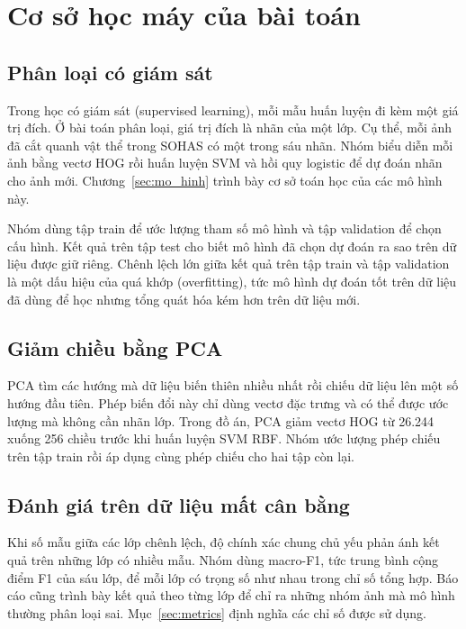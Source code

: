 \section{Cơ sở học máy của bài toán}
\label{sec:hoc_may}

\subsection{Phân loại có giám sát}

Trong học có giám sát (supervised learning), mỗi mẫu huấn luyện đi kèm một giá trị đích. Ở bài toán phân loại, giá trị đích là nhãn của một lớp. Cụ thể, mỗi ảnh đã cắt quanh vật thể trong SOHAS có một trong sáu nhãn. Nhóm biểu diễn mỗi ảnh bằng vectơ HOG rồi huấn luyện SVM và hồi quy logistic để dự đoán nhãn cho ảnh mới. Chương~\ref{sec:mo_hinh} trình bày cơ sở toán học của các mô hình này.

Nhóm dùng tập train để ước lượng tham số mô hình và tập validation để chọn cấu hình. Kết quả trên tập test cho biết mô hình đã chọn dự đoán ra sao trên dữ liệu được giữ riêng. Chênh lệch lớn giữa kết quả trên tập train và tập validation là một dấu hiệu của quá khớp (overfitting), tức mô hình dự đoán tốt trên dữ liệu đã dùng để học nhưng tổng quát hóa kém hơn trên dữ liệu mới.

\subsection{Giảm chiều bằng PCA}

PCA tìm các hướng mà dữ liệu biến thiên nhiều nhất rồi chiếu dữ liệu lên một số hướng đầu tiên. Phép biến đổi này chỉ dùng vectơ đặc trưng và có thể được ước lượng mà không cần nhãn lớp. Trong đồ án, PCA giảm vectơ HOG từ 26.244 xuống 256 chiều trước khi huấn luyện SVM RBF. Nhóm ước lượng phép chiếu trên tập train rồi áp dụng cùng phép chiếu cho hai tập còn lại.

\subsection{Đánh giá trên dữ liệu mất cân bằng}

Khi số mẫu giữa các lớp chênh lệch, độ chính xác chung chủ yếu phản ánh kết quả trên những lớp có nhiều mẫu. Nhóm dùng macro-F1, tức trung bình cộng điểm F1 của sáu lớp, để mỗi lớp có trọng số như nhau trong chỉ số tổng hợp. Báo cáo cũng trình bày kết quả theo từng lớp để chỉ ra những nhóm ảnh mà mô hình thường phân loại sai. Mục~\ref{sec:metrics} định nghĩa các chỉ số được sử dụng.
